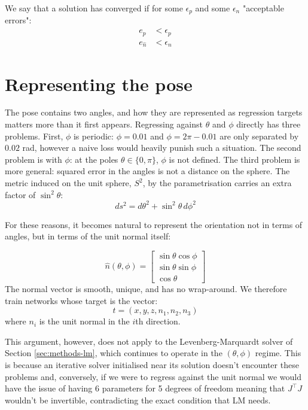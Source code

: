 We say that a solution has converged if for some $\epsilon_p$ and some $\epsilon_n$ "acceptable errors":
\begin{align*}
  e_p &< \epsilon_p \\
  e_{\hat{n}} &< \epsilon_n 
\end{align*}

\section{Representing the pose}\label{sec:representation}
The pose contains two angles, and how they are represented as regression targets matters more than it first appears. Regressing against $\theta$ and $\phi$ directly has three problems. First, $\phi$ is periodic: $\phi = 0.01$ and $\phi = 2\pi - 0.01$ are only separated by $0.02$ rad, however a naive loss would heavily punish such a situation. The second problem is with $\phi$: at the poles $\theta \in \{0,\pi\}$, $\phi$ is not defined. The third problem is more general: squared error in the angles is not a distance on the sphere. The metric induced on the unit sphere, $S^2$, by the parametrisation carries an extra factor of $\sin^2\theta$:
\begin{equation}
  ds^2 = d\theta^2 + \sin^2\theta \, d\phi^2 
\end{equation}

For these reasons, it becomes natural to represent the orientation not in terms of angles, but in terms of the unit normal itself:

\begin{equation}
  \hat{n}(\theta,\phi) = \begin{bmatrix} \sin\theta\cos\phi \\ \sin\theta\sin\phi \\ \cos\theta \end{bmatrix}
\end{equation}
The normal vector is smooth, unique, and has no wrap-around. We therefore train networks whose target is the vector:
\begin{equation}
  t = (x,y,z,n_1,n_2,n_3)
\end{equation}
where $n_i$ is the unit normal in the $i$th direction.

This argument, however, does not apply to the Levenberg-Marquardt solver of Section \ref{sec:methods-lm}, which continues to operate in the $(\theta,\phi)$ regime. This is because an iterative solver initialised near its solution doesn't encounter these problems and, conversely, if we were to regress against the unit normal we would have the issue of having 6 parameters for 5 degrees of freedom meaning that $J^{\top} J$ wouldn't be invertible, contradicting the exact condition that LM needs.  



